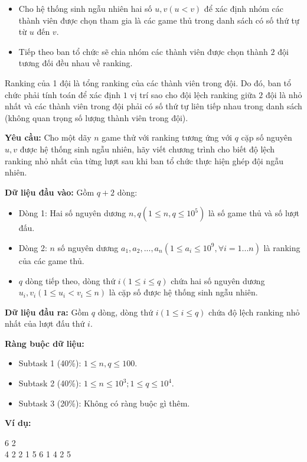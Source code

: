 \documentclass[12pt]{scrartcl}  %
\begin{document}
\begin{itemize}
    \item Cho hệ thống sinh ngẫu nhiên hai số $u, v (u < v)$ để xác định nhóm các thành viên được chọn tham gia là các game thủ trong danh sách có số thứ tự từ $u$ đến $v$.
    \item Tiếp theo ban tổ chức sẽ chia nhóm các thành viên được chọn thành $2$ đội tương đối đều nhau về ranking.
\end{itemize}

Ranking của 1 đội là tổng ranking của các thành viên trong đội. Do đó, ban tổ chức phải tính toán để xác định $1$ vị trí sao cho đội lệch ranking giữa $2$ đội là nhỏ nhất và các thành viên trong đội phải có số thứ tự liên tiếp nhau trong danh sách (không quan trọng số lượng thành viên trong đội). 

\textbf{Yêu cầu:} Cho một dãy $n$ game thử với ranking tương ứng với $q$ cặp số nguyên $u, v$ được hệ thống sinh ngẫu nhiên, hãy viết chương trình cho biết độ lệch ranking nhỏ nhất của từng lượt sau khi ban tổ chức thực hiện ghép đội ngẫu nhiên. 

\textbf{Dữ liệu đầu vào:}
Gồm $q + 2$ dòng:
\begin{itemize}
    \item Dòng 1: Hai số nguyên dương $n, q (1 \leq n, q \leq 10^5)$ là số game thủ và số lượt đấu.
    \item Dòng 2: $n$ số nguyên dương $a_1, a_2, ..., a_n (1 \leq a_i \leq 10^9, \forall i = 1 ... n)$ là ranking của các game thủ.
    \item $q$ dòng tiếp theo, dòng thứ $i (1 \leq i \leq q)$ chứa hai số nguyên dương $u_i, v_i (1 \leq u_i < v_i \leq n)$ là cặp số được hệ thống sinh ngẫu nhiên.
\end{itemize}

\textbf{Dữ liệu đầu ra:}
Gồm $q$ dòng, dòng thứ $i (1 \leq i \leq q)$ chứa độ lệch ranking nhỏ nhất của lượt đấu thứ $i$.

\textbf{Ràng buộc dữ liệu:}
\begin{itemize}
    \item Subtask 1 (40\%): $1 \leq n, q \leq 100$.
    \item Subtask 2 (40\%): $1 \leq n \leq 10^3; 1 \leq q \leq 10^4$.
    \item Subtask 3 (20\%): Không có ràng buộc gì thêm.
\end{itemize}

\textbf{Ví dụ:}
\begin{tcolorbox}[colback=gray!5!white, colframe=blue!50!black, title=Input]
6 2\\
4 2 2 1 5 6
1 4
2 5
\end{tcolorbox}
\end{document}

